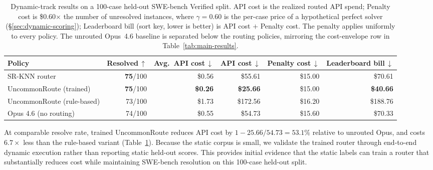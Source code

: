 \begin{table}[t]
\centering
\small
\begin{adjustbox}{max width=\linewidth}
\begin{tabular}{lrrrrr}
\toprule
Policy & Resolved\,$\uparrow$ & Avg.\ API cost\,$\downarrow$ & API cost\,$\downarrow$ & Penalty cost\,$\downarrow$ & Leaderboard bill\,$\downarrow$ \\
\midrule
SR-KNN router & \textbf{75}/100 & \$0.56 & \$55.61 & \$15.00 & \$70.61 \\
UncommonRoute (trained) & \textbf{75}/100 & \textbf{\$0.26} & \textbf{\$25.66} & \$15.00 & \textbf{\$40.66} \\
UncommonRoute (rule-based) & 73/100 & \$1.73 & \$172.56 & \$16.20 & \$188.76 \\
\midrule
Opus 4.6 (no routing) & 74/100 & \$0.55 & \$54.73 & \$15.60 & \$70.33 \\
\bottomrule
\end{tabular}
\end{adjustbox}
\caption{Dynamic-track results on a 100-case held-out SWE-bench Verified
split. API cost is the realized routed API spend; Penalty cost is
\$0.60$\times$ the number of unresolved instances, where $\gamma{=}0.60$
is the per-case price of a hypothetical perfect solver
(\S\ref{sec:dynamic-scoring}); Leaderboard bill (sort key, lower is better)
is API cost $+$ Penalty cost. The penalty applies uniformly to every
policy. The unrouted Opus~4.6 baseline is separated below the routing policies,
mirroring the cost-envelope row in Table~\ref{tab:main-results}.}
\label{tab:dynamic-heldout}
\end{table}

At comparable resolve rate, trained UncommonRoute reduces API cost
by $1-25.66/54.73=53.1\%$ relative to unrouted Opus, and costs $6.7\times$
less than the rule-based variant (Table~\ref{tab:dynamic-heldout}). Because
the static corpus is small, we validate the trained router through
end-to-end dynamic execution rather than reporting static held-out scores.
This provides initial evidence that the static labels can train a router
that substantially reduces cost while maintaining SWE-bench resolution on
this 100-case held-out split.
